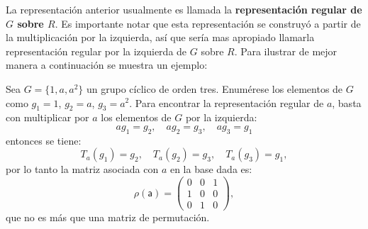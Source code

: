 La representación anterior usualmente es llamada la \textbf{representación regular de $G$ sobre $R$}. Es importante notar que esta representación se construyó a partir de la multiplicación por la izquierda, así que sería mas apropiado llamarla representación regular por la izquierda de $G$ sobre $R$. Para ilustrar de mejor manera a continuación se muestra un ejemplo:

\begin{ejemplo}
Sea $G = \{ 1,a,a^2 \}$ un grupo cíclico de orden tres. Enumérese los elementos de $G$ como $g_1 = 1$, $g_2 = a$, $g_3 = a^2$. Para encontrar la representación regular de $a$, basta con multiplicar por $a$ los elementos de $G$ por la izquierda:
\begin{equation*}  
ag_1 = g_2, \quad ag_2 = g_3, \quad ag_3 = g_1 
\end{equation*} entonces se tiene:
\begin{equation*}  T_a(g_1) = g_2, \quad T_a(g_2) = g_3, \quad T_a(g_3) = g_1, \end{equation*} por lo tanto la matriz asociada con $a$ en la base dada es:
\begin{equation*} \mathsf{\rho(a)} =  \begin{pmatrix}
0 & 0 & 1 \\
1 & 0 & 0 \\
0 & 1 & 0
\end{pmatrix},  \end{equation*} que no es más que una matriz de permutación.
\end{ejemplo}
